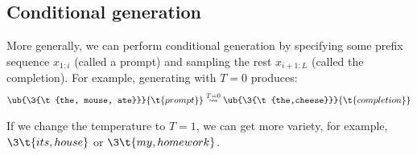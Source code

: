 \subsection{Conditional generation}
More generally, we can perform conditional generation by specifying some prefix sequence $x_{1: i}$ (called a prompt) and sampling the rest $x_{i+1: L}$ (called the completion). For example, generating with $T=0$ produces:
\begin{align*}
\ub{\3{\t{the, mouse, ate}}}{\t{prompt}} \overset{T=0}{\leadsto} 
\ub{\3{\t{the,cheese}}}{\t{completion}}
\end{align*}

If we change the temperature to $T=1$, we can get more variety, for example, $\3{\t{its, house}}$ or $\3{\t{my, homework}}$.
